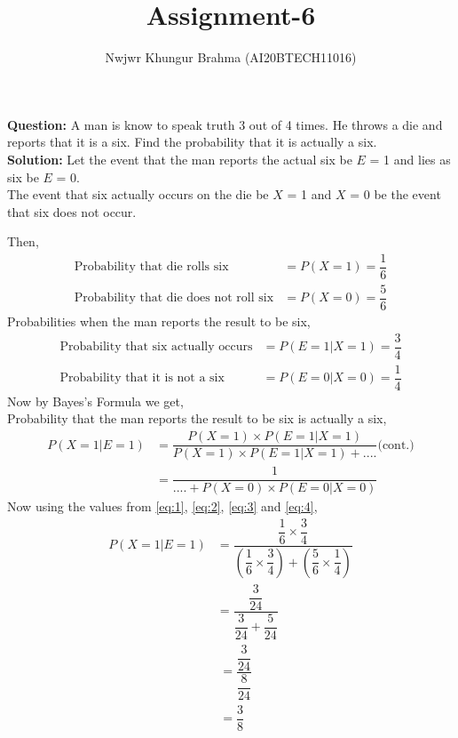 \documentclass[journal,12pt,twocolumn]{IEEEtran}
\title{Assignment-6}
\author{Nwjwr Khungur Brahma (AI20BTECH11016)}
\begin{document}
\maketitle
\textbf{Question:}
A man is know to speak truth 3 out of 4 times. He throws a die and reports that it is a six. Find the probability that it is actually a six.\\
\textbf{Solution:}
Let the event that the man reports the actual six be $E$ = 1 and lies as six be $E$ = 0.\\The event that six actually occurs on the die be $X$ = 1 and $X$ = 0 be the event that six does not occur.\\
\begin{table}[ht!]

\end{table}
Then,
\begin{align}
\text{Probability that die rolls six}&=P(X=1)=\dfrac{1}{6}\label{eq:1}\\
\text{Probability that die does not roll six}&=P(X=0)=\dfrac{5}{6}\label{eq:2}
\end{align}
Probabilities when the man reports the result to be six,
\begin{align}
\text{Probability that six actually occurs}&=P(E=1|X=1)=\dfrac{3}{4}\label{eq:3}\\
\text{Probability that it is not a six}&=P(E=0|X=0)=\dfrac{1}{4}\label{eq:4}
\end{align}
Now by Bayes's Formula we get,\\
Probability that the man reports the result to be six is actually a six,\\
\begin{align}
P(X=1|E=1)&=\dfrac{P(X=1)\times P(E=1|X=1)}{P(X=1)\times P(E=1|X=1)+....}\text{(cont.)}\\
&=\dfrac{1}{....+P(X=0)\times P(E=0|X=0)}
\end{align}
Now using the values from \eqref{eq:1}, \eqref{eq:2}, \eqref{eq:3} and \eqref{eq:4},
\begin{align}
P(X=1|E=1)&=\dfrac{\dfrac{1}{6}\times \dfrac{3}{4}}{\left(\dfrac{1}{6}\times \dfrac{3}{4}\right)+\left(\dfrac{5}{6}\times\dfrac{1}{4}\right)}\\
&=\dfrac{\dfrac{3}{24}}{\dfrac{3}{24}+\dfrac{5}{24}}
\end{align}
\begin{align}
&=\dfrac{\dfrac{3}{24}}{\dfrac{8}{24}}\\
&=\dfrac{3}{8}
\end{align}
\end{document}
